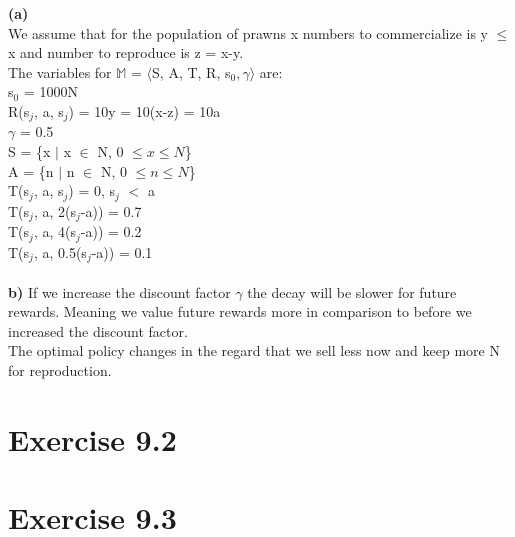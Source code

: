 \documentclass[12pt]{article}
\begin{document}
\textbf{(a)}\\
We assume that for the population of prawns x numbers to commercialize is y $\leq$ x and number to reproduce is z = x-y.\\
The variables for $\mathbb{M}$ = $\langle$S, A, T, R, s$_{0}, \gamma \rangle$ are:\\
s$_{0}$ = 1000N\\
R(s$_{j}$, a, s$_{j}$) = 10y = 10(x-z) = 10a\\
$\gamma$ = 0.5\\
S = \{x $\mid$ x $\in$ N, 0 $\leq x \leq N$\}\\
A = \{n $\mid$ n $\in$ N, 0 $\leq n \leq N$\}\\
T(s$_{j}$, a, s$_{j}$) = 0, s$_{j}$ $<$ a\\
T(s$_{j}$, a, 2(s$_{j}$-a)) = 0.7\\
T(s$_{j}$, a, 4(s$_{j}$-a)) = 0.2\\
T(s$_{j}$, a, 0.5(s$_{j}$-a)) = 0.1\\\\
\textbf{b)} If we increase the discount factor $\gamma$ the decay will be slower for future rewards. Meaning we value future rewards more in comparison to before we increased the discount factor.\\The optimal policy changes in the regard that we sell less now and keep more N for reproduction.

\section*{Exercise 9.2}


\section*{Exercise 9.3}
\end{document}
